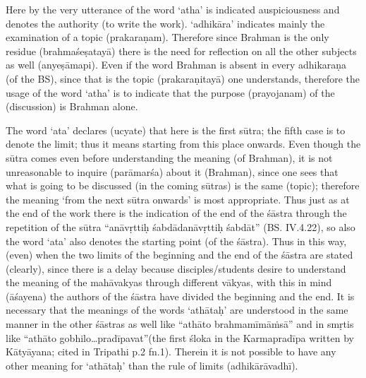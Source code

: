 Here by the very utterance of the word ‘atha’ is indicated auspiciousness and denotes the authority (to write the work). ‘adhikāra’ indicates mainly the examination of a topic (prakaraṇam). Therefore since Brahman is the only residue (brahmaśeṣatayā) there is the need for reflection on all the other subjects as well (anyeṣāmapi). Even if the word Brahman is absent in every adhikaraṇa (of the BS), since that is the topic (prakaraṇitayā) one understands, therefore the usage of the word ‘atha’ is to indicate that the purpose (prayojanam) of the (discussion) is Brahman alone. 

The word ‘ata’ declares (ucyate) that here is the first sūtra; the fifth case is to denote the limit; thus it means starting from this place onwards. Even though the sūtra comes even before understanding the meaning (of  Brahman), it is not  unreasonable to inquire (parāmarśa) about it (Brahman), since one sees that what is going to be discussed (in the coming sūtras) is the same (topic); therefore the meaning ‘from the next sūtra onwards’ is most appropriate. Thus just as at the end of the work there is the indication of the end of the śāstra through the repetition of the sūtra “anāvṛttiḥ śabdādanāvṛttiḥ śabdāt” (BS. IV.4.22), so also the word ‘ata’ also denotes the starting point (of the śāstra). Thus in this way, (even) when the two limits of the beginning and the end of the śāstra are stated (clearly), since there is a delay because disciples/students desire to understand the meaning of the mahāvakyas through different vākyas, with this in mind (āśayena) the authors of the śāstra have divided the beginning and the end. It is necessary that the meanings of the words ‘athātaḥ’ are understood in the same manner in the other śāstras as well like “athāto brahmamīmāṁsā” and in smṛtis like “athāto gobhilo…pradīpavat”(the first śloka in the Karmapradīpa written by Kātyāyana; cited in Tripathi p.2 fn.1). Therein it is not possible to have any other meaning for ‘athātaḥ’ than the rule of limits (adhikārāvadhī).


